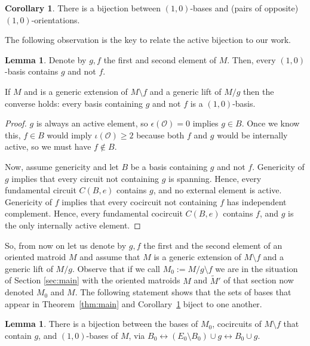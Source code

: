 \documentclass[12pt]{amsart}
\numberwithin{equation}{section}
\theoremstyle{definition}
\newtheorem{lemma}[theorem]{Lemma}
\newtheorem{corollary}[theorem]{Corollary}
\newcommand{\Ocal}{{\mathcal O}}
\begin{document}
\begin{corollary} 
\label{coro:G_LV_bij}
There is a bijection between 
$(1,0)$-bases and (pairs of opposite) $(1,0)$-orientations.
\end{corollary}


The following observation is the key to relate the active bijection to our work.

\begin{lemma} \label{lem:10_basis}
Denote by $g, f$ the first and second element of $M$. Then,
every $(1,0)$-basis  contains $g$ and not $f$. 

If $M$ and is a generic extension of $M\setminus f$ and a generic lift of $M/g$ then the converse holds: every basis containing $g$ and not $f$ is a $(1,0)$-basis.
\end{lemma}


\begin{proof}
$g$ is always an active element, so $\epsilon(\Ocal)=0$ implies $g\in B$. Once we know this, $f\in B$ would imply $\iota(\Ocal)\ge 2$ because both $f$ and $g$ would be internally active, so we must have $f\not\in B$.

Now, assume genericity and let $B$ be a basis containing $g$ and not $f$. Genericity of $g$ implies that every circuit not containing $g$ is spanning. Hence, every fundamental circuit $C(B,e)$ contains $g$, and no external element is active.
Genericity of $f$ implies that every cocircuit not containing $f$ has independent complement. Hence, every fundamental cocircuit $C(B,e)$ contains $f$, and $g$ is the only internally active element.
\end{proof}

So, from now on let us denote by $g,f$ the first and the second element of an oriented matroid $M$ and assume that $M$ is a generic extension of $M\setminus f$ and a generic lift of $M/g$. Observe that if we call $M_0:=M/g\setminus f$ we are in the situation of Section \ref{sec:main} with the oriented matroids $M$ and $\widetilde M'$ of that section now denoted $M_0$ and $M$. The following statement shows that the sets of bases that appear in 
Theorem~\ref{thm:main} and Corollary~\ref{coro:G_LV_bij} biject to one another.

\begin{lemma} \label{lem:basis_corr}
There is a bijection between the bases of $M_0$, cocircuits of $M\setminus f$ that contain $g$, and $(1,0)$-bases of $M$, via $B_0\leftrightarrow(E_0\setminus B_0)\cup g\leftrightarrow B_0\cup g$.
\end{lemma}
\end{document}
